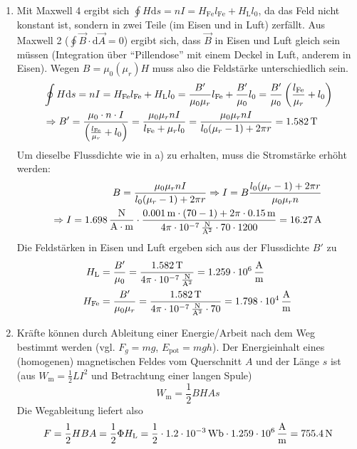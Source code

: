 \documentclass[a4paper]{scrartcl}
\begin{document}
\begin{enumerate}[noitemsep]
  \item Mit Maxwell 4 ergibt sich $\oint H \text{d}s = nI = H_\text{Fe}l_\text{Fe} + H_\text{L}l_0$, da das Feld nicht konstant ist, sondern in zwei Teile (im Eisen und in Luft) zerfällt. Aus Maxwell 2 ($\oint \vec B \cdot \text{d}\vec A = 0$) ergibt sich, dass $\vec B$ in Eisen und Luft gleich sein müssen (Integration über "`Pillendose"' mit einem Deckel in Luft, anderem in Eisen). Wegen $B = \mu_0(\mu_r)H$ muss also die Feldstärke unterschiedlich sein.
    \begin{align*}
      & \oint H\text{d}s = nI = H_\text{Fe}l_\text{Fe} + H_\text{L}l_0 = \frac{B'}{\mu_0\mu_r}l_\text{Fe} + \frac{B'}{\mu_0}l_0 = \frac{B'}{\mu_0}\left( \frac{l_\text{Fe}}{\mu_r} + l_0 \right)\\
      & \Rightarrow B' = \frac{\mu_0 \cdot n \cdot I}{\left( \frac{l_\text{Fe}}{\mu_r} + l_0 \right)} = \frac{\mu_0 \mu_r nI}{l_\text{Fe} + \mu_rl_0} = \frac{\mu_0\mu_rnI}{l_0(\mu_r -1 ) + 2\pi r} = \unit[1.582]{T}
    \end{align*}
    Um dieselbe Flussdichte wie in a) zu erhalten, muss die Stromstärke erhöht werden:
    \begin{align*}
      B = \frac{\mu_0\mu_r nI}{l_0(\mu_r - 1) + 2\pi r} \Rightarrow I = B \frac{l_0(\mu_r-1)+2\pi r}{\mu_0\mu_rn} \\
      \Rightarrow I = \unit[1.698]{\frac{N}{A\cdot m}} \cdot \frac{\unit[0.001]{m} \cdot (70-1) + 2\pi \cdot \unit[0.15]{m}}{4\pi\cdot\unit[10^{-7}]{\frac{N}{A^2}} \cdot 70 \cdot 1200} = \unit[16.27]{A}
    \end{align*}
    Die Feldstärken in Eisen und Luft ergeben sich aus der Flussdichte $B'$ zu
    \begin{align*}
      H_\text{L} &= \frac{B'}{\mu_0} = \frac{\unit[1.582]{T}}{4\pi\cdot\unit[10^{-7}]{\frac{N}{A^2}}} = \unit[1.259\cdot 10^6]{\frac{A}{m}} \\
      H_\text{Fe} &= \frac{B'}{\mu_0\mu_r} = \frac{\unit[1.582]{T}}{4\pi\cdot\unit[10^{-7}]{\frac{N}{A^2}}\cdot 70 } = \unit[1.798 \cdot 10^4]{\frac{A}{m}}
    \end{align*}
  \item Kräfte können durch Ableitung einer Energie/Arbeit nach dem Weg bestimmt werden (vgl. $F_g = mg$, $E_\text{pot} = mgh$). Der Energieinhalt eines (homogenen) magnetischen Feldes vom Querschnitt $A$ und der Länge $s$ ist (aus $W_\text{m} = \frac{1}{2}LI^2$ und Betrachtung einer langen Spule)
    \begin{equation*}
      W_\text{m} = \frac{1}{2}BHAs
    \end{equation*}
Die Wegableitung liefert also 
\begin{equation*}
  F = \frac{1}{2}HBA=  \frac{1}{2} \Phi  H_\text{L} = \frac{1}{2} \cdot \unit[1.2\cdot 10^{-3}]{Wb} \cdot \unit[1.259 \cdot 10^6]{\frac{A}{m}} = \unit[755.4]{N}
\end{equation*}
\end{enumerate}
\end{document}
